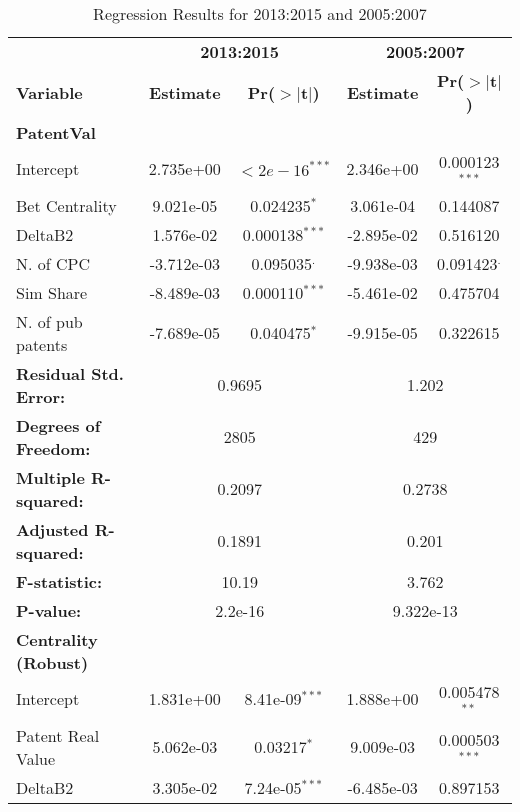 \documentclass{article}
\begin{document}
\begin{table}[h!]
\centering
\caption{Regression Results for 2013:2015 and 2005:2007}
\label{tab:regression_comparison}
\begin{tabular}{lcccc}
\toprule
 & \multicolumn{2}{c}{\textbf{2013:2015}} & \multicolumn{2}{c}{\textbf{2005:2007}} \\
\cmidrule(lr){2-3} \cmidrule(lr){4-5}
\textbf{Variable} & \textbf{Estimate} & \textbf{Pr($>|$t$|$)} & \textbf{Estimate} & \textbf{Pr($>|$t$|$)} \\
\midrule
\textbf{PatentVal} & & & & \\
Intercept         & 2.735e+00 & $<2e-16^{***}$ & 2.346e+00 & 0.000123$^{***}$ \\
Bet Centrality         & 9.021e-05 & 0.024235$^{*}$ & 3.061e-04 & 0.144087 \\
DeltaB2                & 1.576e-02 & 0.000138$^{***}$ & -2.895e-02 & 0.516120 \\
N. of CPC           & -3.712e-03 & 0.095035$^{.}$ & -9.938e-03 & 0.091423$^{.}$ \\
Sim Share         & -8.489e-03 & 0.000110$^{***}$ & -5.461e-02 & 0.475704 \\
N. of pub patents              & -7.689e-05 & 0.040475$^{*}$ & -9.915e-05 & 0.322615 \\
\midrule
\multicolumn{1}{l}{\textbf{Residual Std. Error:}} & \multicolumn{2}{c}{0.9695} & \multicolumn{2}{c}{1.202} \\
\multicolumn{1}{l}{\textbf{Degrees of Freedom:}} & \multicolumn{2}{c}{2805} & \multicolumn{2}{c}{429} \\
\multicolumn{1}{l}{\textbf{Multiple R-squared:}} & \multicolumn{2}{c}{0.2097} & \multicolumn{2}{c}{0.2738} \\
\multicolumn{1}{l}{\textbf{Adjusted R-squared:}} & \multicolumn{2}{c}{0.1891 } & \multicolumn{2}{c}{0.201 } \\
\multicolumn{1}{l}{\textbf{F-statistic:}} & \multicolumn{2}{c}{10.19} & \multicolumn{2}{c}{3.762} \\
\multicolumn{1}{l}{\textbf{P-value:}} & \multicolumn{2}{c}{2.2e-16} & \multicolumn{2}{c}{9.322e-13} \\
\midrule
\textbf{Centrality (Robust)} & & & & \\
Intercept         & 1.831e+00 & 8.41e-09$^{***}$ & 1.888e+00 & 0.005478$^{**}$ \\
Patent Real Value          & 5.062e-03 & 0.03217$^{*}$ & 9.009e-03 & 0.000503$^{***}$ \\
DeltaB2              & 3.305e-02 & 7.24e-05$^{***}$ & -6.485e-03 & 0.897153 \\

\end{tabular}
\end{table}
\end{document}
